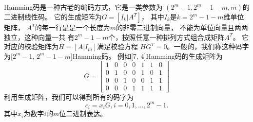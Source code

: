 Hamming码是一种古老的编码方式，它是一类参数为
$(2^m-1, 2^m-1-m, m)$的二进制线性码\cite{jd2001xxlybm}。
它的生成矩阵为$G= [ I_k  | A^T]$，
其中$I_k$是$k=2^m-1-m$维单位矩阵，
$A^T$的每一行是是一个长度为$m$的非零二进制向量，
不能为单位向量且两两独立，这种向量一共
有$2^m-1-m$个，按照任意一种排列方式组合成矩阵$A^T$。
它对应的校验矩阵为$H = [A | I_{m}]$满足校验方程
$H G^T = 0$。一般的，我们称这种码字为[$2^m-1$, $2^m-1-m$]Hamming码。
例如[7, 4]Hamming码的生成矩阵为
\begin{equation}
G = \begin{bmatrix}
        1 & 0 & 0 & 0 & 1 & 1 & 0 \\
        0 & 1 & 0 & 0 & 1 & 0 & 1 \\
        0 & 0 & 1 & 0 & 0 & 1 & 1 \\
        0 & 0 & 0 & 1 & 1 & 1 & 1 
    \end{bmatrix}
\end{equation}
利用生成矩阵，我们可以得到所有的码字为
\begin{equation}
c_i = x_i G, i=0,1,...,2^m-1.
\end{equation}
其中$x_i$为数字$i$的$m$位二进制表达。

